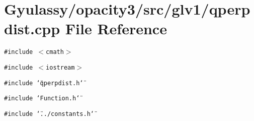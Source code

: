 \section{Gyulassy/opacity3/src/glv1/qperpdist.cpp File Reference}
\label{qperpdist_8cpp}
{\tt \#include $<$cmath$>$}\par
{\tt \#include $<$iostream$>$}\par
{\tt \#include \char`\"{}qperpdist.h\char`\"{}}\par
{\tt \#include \char`\"{}Function.h\char`\"{}}\par
{\tt \#include \char`\"{}../constants.h\char`\"{}}\par
